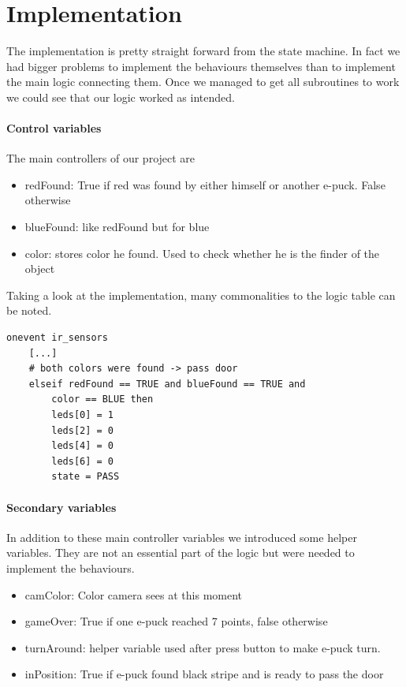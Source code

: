 \documentclass[12pt,a4paper]{article}
\begin{document}
\section{Implementation}
The implementation is pretty straight forward from the state machine. In fact we had bigger problems to implement the behaviours themselves than to implement the main logic connecting them. Once we managed to get all subroutines to work we could see that our logic worked as intended.
\paragraph{Control variables}
The main controllers of our project are 
\begin{itemize}
	\item redFound: True if red was found by either himself or another e-puck. False otherwise
	\item blueFound: like redFound but for blue
	\item color: stores color he found. Used to check whether he is the finder of the object
\end{itemize}
Taking a look at the implementation, many commonalities to the logic table can be noted.
\begin{lstlisting}
onevent ir_sensors
	[...]
	# both colors were found -> pass door
	elseif redFound == TRUE and blueFound == TRUE and
	   	color == BLUE then
	   	leds[0] = 1
		leds[2] = 0
		leds[4] = 0
		leds[6] = 0
		state = PASS
\end{lstlisting}

\paragraph{Secondary variables}
In addition to these main controller variables we introduced some helper variables. They are not an essential part of the logic but were needed to implement the behaviours. 
\begin{itemize}
	\item camColor: Color camera sees at this moment
	\item gameOver: True if one e-puck reached 7 points, false otherwise
	\item turnAround: helper variable used after press button to make e-puck turn. 
	\item inPosition: True if e-puck found black stripe and is ready to pass the door
\end{itemize}
\end{document}

